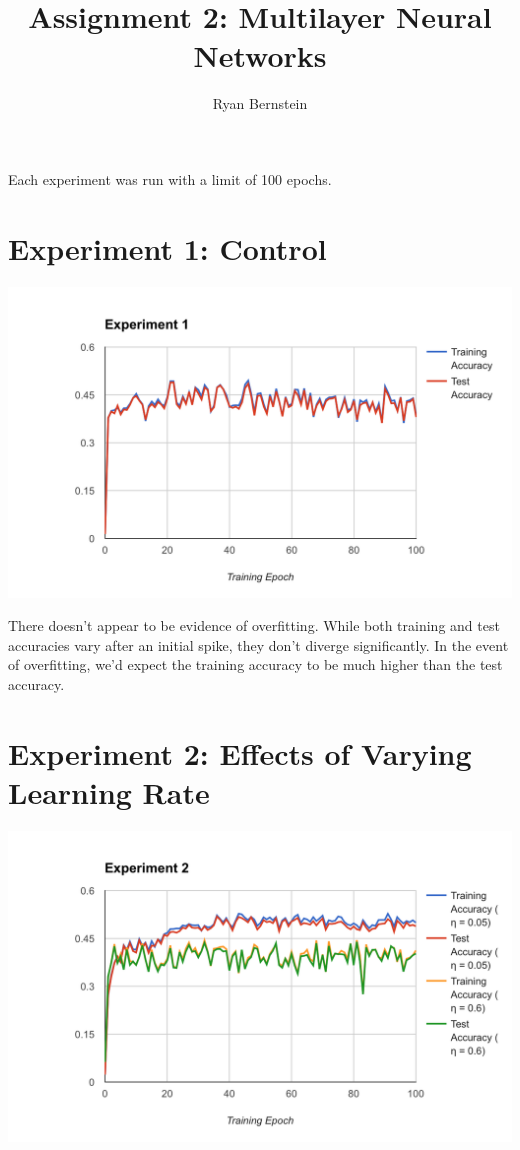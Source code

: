 \documentclass[11pt, oneside]{article}    %
\title{Assignment 2: Multilayer Neural Networks}
\author{Ryan Bernstein}
\begin{document}
\maketitle

Each experiment was run with a limit of 100 epochs.

\section*{Experiment 1: Control}

\begin{center}
	\includegraphics[width=6in]{Exp1}
\end{center}

There doesn't appear to be evidence of overfitting. While both training and test accuracies vary after an initial spike, they don't diverge significantly. In the event of overfitting, we'd expect the training accuracy to be much higher than the test accuracy.

\section*{Experiment 2: Effects of Varying Learning Rate}

\begin{center}
	\includegraphics[width=6in]{Exp2}
\end{center}
\end{document}
